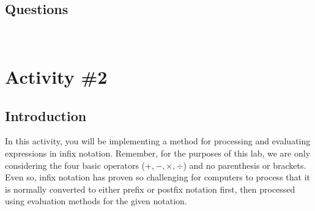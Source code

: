 		\subsection{Questions}
			\ \\[9pt]

	\pagebreak

	\section{Activity \#2}
		\subsection{Introduction}
			In this activity, you will be implementing a method for processing and evaluating expressions in infix notation. Remember, for the purposes of this lab, we are only considering the four basic operators ($+, -, \times, \div$) and no parenthesis or brackets. Even so, infix notation has proven so challenging for computers to process that it is normally converted to either prefix or postfix notation first, then processed using evaluation methods for the given notation.


